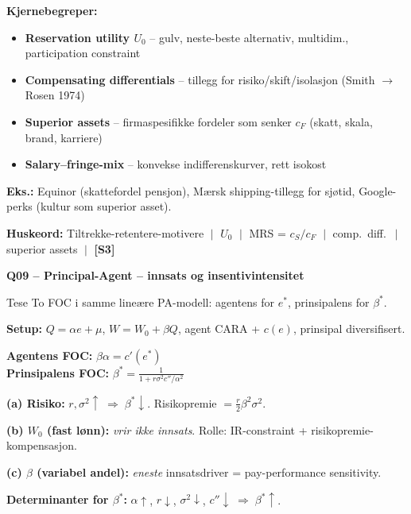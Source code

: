 \documentclass[10pt, a4paper]{article}
\newcommand{\SThree}{\textcolor{s3color}{\textbf{[S3]}}}
\newcommand{\qhead}[2]{%
  \noindent
  \begin{tcolorbox}[colback=boxborder, colframe=boxborder, arc=2pt, left=6pt, right=6pt, top=2pt, bottom=2pt]
    \color{white}\textbf{\large Q#1 -- #2}
  \end{tcolorbox}
}
\newcommand{\huskeord}[1]{%
  \vspace{2pt}
  \begin{tcolorbox}[colback=yellow!15, colframe=orange!70!black, boxrule=0.4pt, arc=2pt, left=4pt, right=4pt, top=2pt, bottom=2pt]
    \footnotesize\textbf{Huskeord:} #1
  \end{tcolorbox}
}
\begin{document}
\textbf{Kjernebegreper:}
\begin{itemize}
  \item \textbf{Reservation utility $U_0$} -- gulv, neste-beste alternativ, multidim., participation constraint
  \item \textbf{Compensating differentials} -- tillegg for risiko/skift/isolasjon (Smith $\to$ Rosen 1974)
  \item \textbf{Superior assets} -- firmaspesifikke fordeler som senker $c_F$ (skatt, skala, brand, karriere)
  \item \textbf{Salary--fringe-mix} -- konvekse indifferenskurver, rett isokost
\end{itemize}

\textbf{Eks.:} Equinor (skattefordel pensjon), Mærsk shipping-tillegg for sjøtid, Google-perks (kultur som superior asset).

\huskeord{Tiltrekke-retentere-motivere $\;\big|\;$ $U_0$ $\;\big|\;$ MRS = $c_S/c_F$ $\;\big|\;$ comp.\ diff.\ $\;\big|\;$ superior assets $\;\big|\;$ \SThree}

\vfill\newpage

\qhead{09}{Principal-Agent -- innsats og insentivintensitet}

\begin{keybox}{Tese}
To FOC i samme lineære PA-modell: agentens for $e^{*}$, prinsipalens for $\beta^{*}$.
\end{keybox}

\textbf{Setup:} $Q = \alpha e + \mu$, $W = W_0 + \beta Q$, agent CARA + $c(e)$, prinsipal diversifisert.

\begin{formulabox}
\textbf{Agentens FOC:} $\beta \alpha = c'(e^{*})$ \\
\textbf{Prinsipalens FOC:} $\displaystyle \beta^{*} = \frac{1}{1 + r \sigma^{2} c'' / \alpha^{2}}$
\end{formulabox}

\textbf{(a) Risiko:} $r, \sigma^{2} \uparrow \;\Rightarrow\; \beta^{*} \downarrow$. Risikopremie $= \tfrac{r}{2}\beta^{2}\sigma^{2}$.

\textbf{(b) $W_0$ (fast lønn):} \emph{vrir ikke innsats}. Rolle: IR-constraint + risikopremie-kompensasjon.

\textbf{(c) $\beta$ (variabel andel):} \emph{eneste} innsatsdriver = pay-performance sensitivity.

\textbf{Determinanter for $\beta^{*}$:} $\alpha \uparrow$, $r \downarrow$, $\sigma^{2} \downarrow$, $c'' \downarrow \;\Rightarrow\; \beta^{*} \uparrow$.
\end{document}

